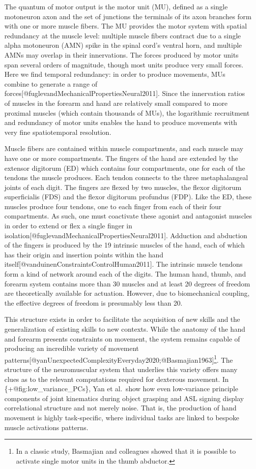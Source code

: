 \documentclass[../main.tex]{subfiles}
\begin{document}
The quantum of motor output is the motor unit (MU), defined as a single motoneuron axon and the set of junctions the terminals of its axon branches form with one or more muscle fibers. The MU provides the motor system with spatial redundancy at the muscle level: multiple muscle fibers contract due to a single alpha motoneuron (AMN) spike in the spinal cord's ventral horn, and multiple AMNs may overlap in their innervations. The forces produced by motor units span several orders of magnitude, though most units produce very small forces. Here we find temporal redundancy: in order to produce movements, MUs combine to generate a range of forces{[}@fuglevandMechanicalPropertiesNeural2011{]}. Since the innervation ratios of muscles in the forearm and hand are relatively small compared to more proximal muscles (which contain thousands of MUs), the logarithmic recruitment and redundancy of motor units enables the hand to produce movements with very fine spatiotemporal resolution.

Muscle fibers are contained within muscle compartments, and each muscle may have one or more compartments. The fingers of the hand are extended by the extensor digitorum (ED) which contains four compartments, one for each of the tendons the muscle produces. Each tendon connects to the three metaphalangeal joints of each digit. The fingers are flexed by two muscles, the flexor digitorum superficialis (FDS) and the flexor digitorum profundus (FDP). Like the ED, these muscles produce four tendons, one to each finger from each of their four compartments. As such, one must coactivate these agonist and antagonist muscles in order to extend or flex a single finger in isolation{[}@fuglevandMechanicalPropertiesNeural2011{]}. Adduction and abduction of the fingers is produced by the 19 intrinsic muscles of the hand, each of which has their origin and insertion points within the hand itself{[}@vanduinenConstraintsControlHuman2011{]}. The intrinsic muscle tendons form a kind of network around each of the digits. The human hand, thumb, and forearm system contains more than 30 muscles and at least 20 degrees of freedom are theoretically available for actuation. However, due to biomechanical coupling, the effective degrees of freedom is presumably less than 20.

This structure exists in order to facilitate the acquisition of new skills and the generalization of existing skills to new contexts. While the anatomy of the hand and forearm presents constraints on movement, the system remains capable of producing an incredible variety of movement patterns{[}@yanUnexpectedComplexityEveryday2020;@Basmajian1963{]}\footnote{In   a classic study, Basmajian and colleagues showed that it is possible   to activate single motor units in the thumb abductor.}. The structure of the neuromuscular system that underlies this variety offers many clues as to the relevant computations required for dexterous movement. In \{+@fig:low\_variance\_PCs\}, Yan et al.~show how even low-variance principle components of joint kinematics during object grasping and ASL signing display correlational structure and not merely noise. That is, the production of hand movement is highly task-specific, where individual tasks are linked to bespoke muscle activations patterns.
\end{document}
